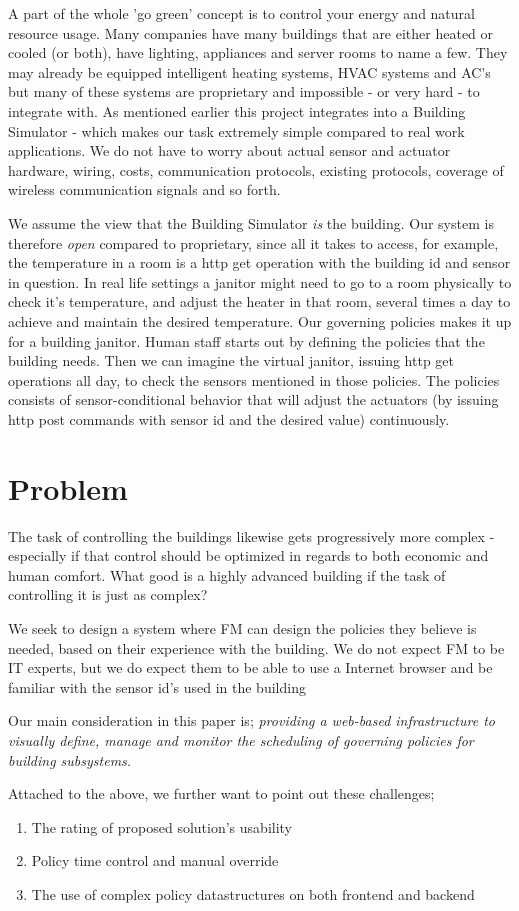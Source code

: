 A part of the whole 'go green' concept is to control your energy and natural resource usage. Many companies have many buildings that are either heated or cooled (or both), have lighting, appliances and server rooms to name a few. They may already be equipped intelligent heating systems, HVAC systems and AC's but many of these systems are proprietary and impossible - or very hard - to integrate with. As mentioned earlier this project integrates into a Building Simulator - which makes our task extremely simple compared to real work applications. We do not have to worry about actual sensor and actuator hardware, wiring, costs, communication protocols, existing protocols, coverage of wireless communication signals and so forth.

We assume the view that the Building Simulator \textit{is} the building. Our system is therefore \textit{open} compared to proprietary, since all it takes to access, for example, the temperature in a room is a http get operation with the building id and sensor in question. In real life settings a janitor might need to go to a room physically to check it's temperature, and adjust the heater in that room, several times a day to achieve and maintain the desired temperature. Our governing policies makes it up for a building janitor. Human staff starts out by defining the policies that the building needs. Then we can imagine the virtual janitor, issuing http get operations all day, to check the sensors mentioned in those policies. The policies consists of sensor-conditional behavior that will adjust the actuators (by issuing http post commands with sensor id and the desired value) continuously.

\section{Problem}
The task of controlling the buildings likewise gets progressively more complex - especially if that control should be optimized in regards to both economic and human comfort. What good is a highly advanced building if the task of controlling it is just as complex?

We seek to design a system where FM can design the policies they believe is needed, based on their experience with the building. We do not expect FM to be IT experts, but we do expect them to be able to use a Internet browser and be familiar with the sensor id's used in the building

Our main consideration in this paper is; \textit{providing a web-based infrastructure to visually define, manage and monitor the scheduling of governing policies for building subsystems.}

Attached to the above, we further want to point out these challenges;
\begin{enumerate}
	\item The rating of proposed solution's usability
	\item Policy time control and manual override
	\item The use of complex policy datastructures on both frontend and backend
\end{enumerate}